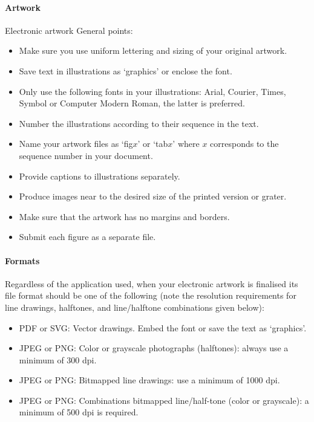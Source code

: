 \paragraph{Artwork}

Electronic artwork
General points:
\begin{itemize}
\item Make sure you use uniform lettering and sizing of your original artwork.
\item Save text in illustrations as `graphics' or enclose the font.
\item Only use the following fonts in your illustrations: Arial, Courier, Times, Symbol or Computer Modern Roman, the latter is preferred.
\item Number the illustrations according to their sequence in the text.
\item Name your artwork files as `fig$x$' or `tab$x$' where $x$ corresponds to the sequence number in your document.%
\item Provide captions to illustrations separately.
\item Produce images near to the desired size of the printed version or grater.
\item Make sure that the artwork has no margins and borders.
\item Submit each figure as a separate file.
\end{itemize}


\paragraph{Formats}

Regardless of the application used, when your electronic artwork is finalised its file format should be one of the following (note the resolution requirements for line drawings, halftones, and line/halftone combinations given below):

\begin{itemize}
\item PDF or SVG: Vector drawings. Embed the font or save the text as `graphics'.
\item JPEG or PNG: Color or grayscale photographs (halftones): always use a minimum of 300 dpi.
\item JPEG or PNG: Bitmapped line drawings: use a minimum of 1000 dpi.
\item JPEG or PNG: Combinations bitmapped line/half-tone (color or grayscale): a minimum of 500 dpi is required.
\end{itemize}

